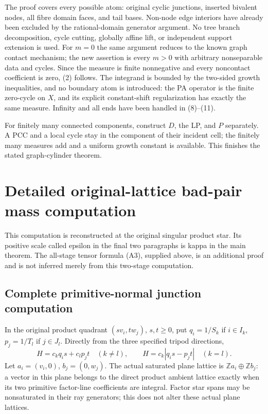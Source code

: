 \documentclass[
  11pt,
]{article}
\begin{document}
The proof covers every possible atom: original cyclic junctions,
inserted bivalent nodes, all fibre domain faces, and tail bases.
Non-node edge interiors have already been excluded by the
rational-domain generator argument. No tree branch decomposition, cycle
cutting, globally affine lift, or independent support extension is used.
For \(m=0\) the same argument reduces to the known graph contact
mechanism; the new assertion is every \(m>0\) with arbitrary
nonseparable data and cycles. Since the measure is finite nonnegative
and every noncontact coefficient is zero, (2) follows. The integrand is
bounded by the two-sided growth inequalities, and no boundary atom is
introduced: the PA operator is the finite zero-cycle on \(X\), and its
explicit constant-shift regularization has exactly the same measure.
Infinity and all ends have been handled in (8)--(11).

For finitely many connected components, construct \(D\), the LP, and
\(P\) separately. A PCC and a local cycle stay in the component of their
incident cell; the finitely many measures add and a uniform growth
constant is available. This finishes the stated graph-cylinder theorem.

\section{Detailed original-lattice bad-pair mass
computation}\label{detailed-original-lattice-bad-pair-mass-computation}

This computation is reconstructed at the original singular product star.
Its positive scale called epsilon in the final two paragraphs is kappa
in the main theorem. The all-stage tensor formula (A3), supplied above,
is an additional proof and is not inferred merely from this two-stage
computation.

\subsection{Complete primitive-normal junction
computation}\label{complete-primitive-normal-junction-computation}

In the original product quadrant \((s v_i,t w_j)\), \(s,t\geq0\), put
\(q_i=1/S_k\) if \(i\in I_k\), \(p_j=1/T_l\) if \(j\in J_l\). Directly
from the three specified tripod directions, \[
 H=c_kq_i s+c_lp_j t\quad(k\ne l),\qquad
 H=c_k|q_i s-p_jt|\quad(k=l).                              \tag{40}
\] Let \(a_i=(v_i,0)\), \(b_j=(0,w_j)\). The actual saturated plane
lattice is \(\mathbb{Z}a_i\oplus\mathbb{Z}b_j\): a vector in this plane
belongs to the direct product ambient lattice exactly when its two
primitive factor-line coefficients are integral. Factor star spans may
be nonsaturated in their ray generators; this does not alter these
actual plane lattices.
\end{document}
